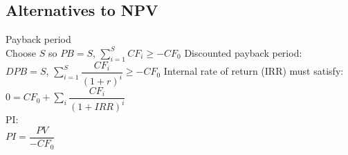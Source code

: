 \subsection*{Alternatives to NPV}
Payback period\\
Choose $S$ so $PB = S$, $\sum_{i=1}^S CF_i \geq - CF_0$ 
Discounted payback period: \\
$DPB = S$, $\sum_{i=1}^S \dfrac{CF_i}{(1+r)^i} \geq - CF_0$
Internal rate of return (IRR) must satisfy: \\
$0 = CF_0 +\sum_i\dfrac{CF_i}{(1+IRR)^i}$ \\
PI:\\
$PI = \dfrac{PV}{-CF_0}$
